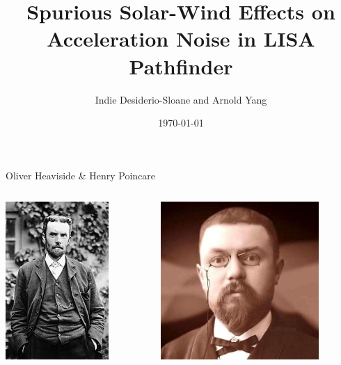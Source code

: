 \documentclass[aspectratio=169,xcolor=dvipsnames]{beamer}
\title[short title]{Spurious Solar-Wind Effects on Acceleration Noise in LISA Pathfinder
} %
\author{Indie Desiderio-Sloane and Arnold Yang}
\institute[Institute for Computing in Research] %
{
   Institute for Computing in Research
}
\date{\today} %
\begin{document}
\begin{frame}
    \titlepage
\end{frame}

\iffalse 
\begin{frame}{Oliver Heaviside \& Henry Poincare}
 \begin{columns}[t]
    \begin{column}{3cm}
    \includegraphics[height=6cm]{220px-Oheaviside.jpg}
    \end{column}
    \begin{column}{6cm}
    \includegraphics[height=6cm]{henry.jpg}
    \end{column}
\end{columns}
\end{frame}
\end{document}
